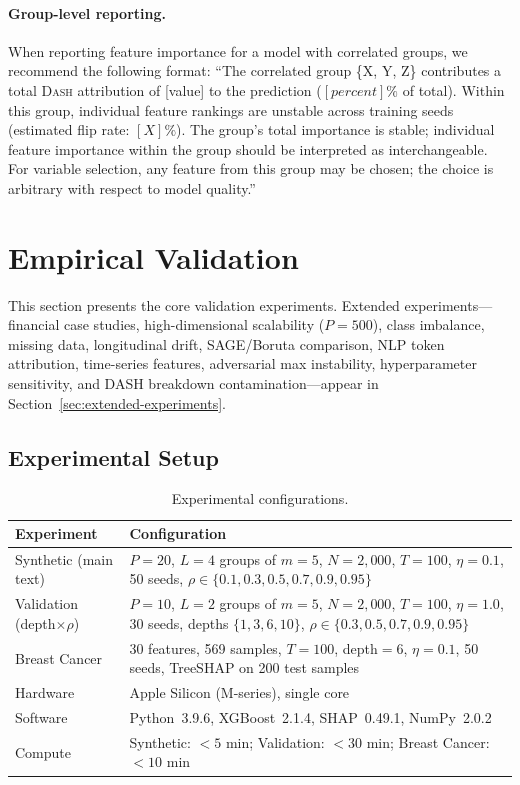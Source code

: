 \documentclass{article}
\newcommand{\DASH}{\textsc{Dash}}
\begin{document}
\paragraph{Group-level reporting.}
When reporting feature importance for a model with correlated groups, we recommend the following format:
``The correlated group \{X, Y, Z\} contributes a total \DASH{} attribution of [value] to the prediction ($[percent]\%$ of total). Within this group, individual feature rankings are unstable across training seeds (estimated flip rate: $[X]\%$). The group's total importance is stable; individual feature importance within the group should be interpreted as interchangeable. For variable selection, any feature from this group may be chosen; the choice is arbitrary with respect to model quality.''


\section{Empirical Validation}
\label{sec:experiments}

\noindent This section presents the core validation experiments. Extended experiments---financial case studies, high-dimensional scalability ($P = 500$), class imbalance, missing data, longitudinal drift, SAGE/Boruta comparison, NLP token attribution, time-series features, adversarial max instability, hyperparameter sensitivity, and DASH breakdown contamination---appear in Section~\ref{sec:extended-experiments}.

\subsection{Experimental Setup}

\begin{table}[t]
\centering
\caption{Experimental configurations.}
\small
\begin{tabular}{@{}lp{10cm}@{}}
\toprule
Experiment & Configuration \\
\midrule
Synthetic (main text) & $P{=}20$, $L{=}4$ groups of $m{=}5$, $N{=}2{,}000$, $T{=}100$, $\eta{=}0.1$, 50 seeds, $\rho \in \{0.1, 0.3, 0.5, 0.7, 0.9, 0.95\}$ \\
Validation (depth$\times\rho$) & $P{=}10$, $L{=}2$ groups of $m{=}5$, $N{=}2{,}000$, $T{=}100$, $\eta{=}1.0$, 30 seeds, depths $\{1,3,6,10\}$, $\rho \in \{0.3, 0.5, 0.7, 0.9, 0.95\}$ \\
Breast Cancer & 30 features, 569 samples, $T{=}100$, depth${=}6$, $\eta{=}0.1$, 50 seeds, TreeSHAP on 200 test samples \\
\midrule
Hardware & Apple Silicon (M-series), single core \\
Software & Python~3.9.6, XGBoost~2.1.4, SHAP~0.49.1, NumPy~2.0.2 \\
Compute & Synthetic: ${<}5$ min; Validation: ${<}30$ min; Breast Cancer: ${<}10$ min \\
\bottomrule
\end{tabular}
\end{table}
\end{document}

